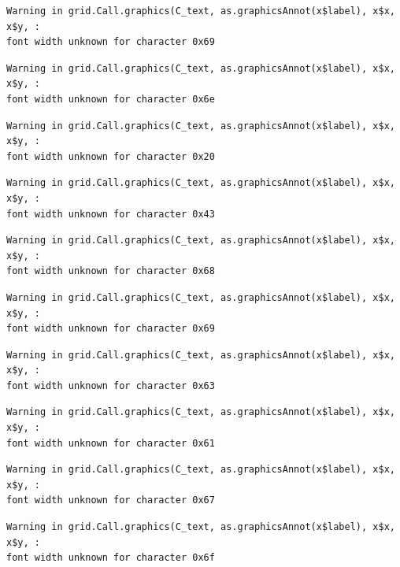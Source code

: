 \documentclass[
  letterpaper,
]{scrbook}
\begin{document}
\begin{verbatim}
Warning in grid.Call.graphics(C_text, as.graphicsAnnot(x$label), x$x, x$y, :
font width unknown for character 0x69
\end{verbatim}

\begin{verbatim}
Warning in grid.Call.graphics(C_text, as.graphicsAnnot(x$label), x$x, x$y, :
font width unknown for character 0x6e
\end{verbatim}

\begin{verbatim}
Warning in grid.Call.graphics(C_text, as.graphicsAnnot(x$label), x$x, x$y, :
font width unknown for character 0x20
\end{verbatim}

\begin{verbatim}
Warning in grid.Call.graphics(C_text, as.graphicsAnnot(x$label), x$x, x$y, :
font width unknown for character 0x43
\end{verbatim}

\begin{verbatim}
Warning in grid.Call.graphics(C_text, as.graphicsAnnot(x$label), x$x, x$y, :
font width unknown for character 0x68
\end{verbatim}

\begin{verbatim}
Warning in grid.Call.graphics(C_text, as.graphicsAnnot(x$label), x$x, x$y, :
font width unknown for character 0x69
\end{verbatim}

\begin{verbatim}
Warning in grid.Call.graphics(C_text, as.graphicsAnnot(x$label), x$x, x$y, :
font width unknown for character 0x63
\end{verbatim}

\begin{verbatim}
Warning in grid.Call.graphics(C_text, as.graphicsAnnot(x$label), x$x, x$y, :
font width unknown for character 0x61
\end{verbatim}

\begin{verbatim}
Warning in grid.Call.graphics(C_text, as.graphicsAnnot(x$label), x$x, x$y, :
font width unknown for character 0x67
\end{verbatim}

\begin{verbatim}
Warning in grid.Call.graphics(C_text, as.graphicsAnnot(x$label), x$x, x$y, :
font width unknown for character 0x6f
\end{verbatim}
\end{document}

